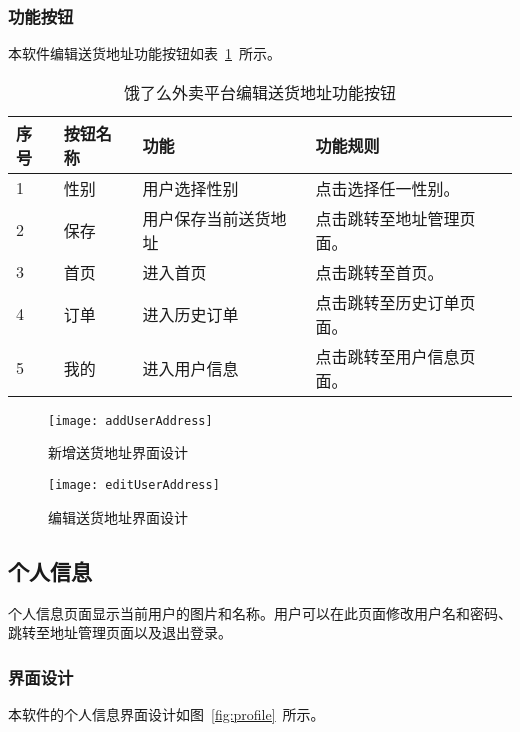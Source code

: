 \subsubsection{功能按钮}
本软件编辑送货地址功能按钮如表~\ref{tab:table12}~所示。
\begin{table}[htbp]
    \caption{饿了么外卖平台编辑送货地址功能按钮}\label{tab:table12}
    \vspace{0.5em}\wuhao
    \begin{tabularx}{\textwidth}{lllX}
    \toprule[1.5pt]
    序号 & 按钮名称 & 功能 & 功能规则 \\ 
    \midrule[1pt]
    1 & 性别 & 用户选择性别 & 点击选择任一性别。 \\
    2 & 保存 & 用户保存当前送货地址 & 点击跳转至地址管理页面。 \\
    3 & 首页 & 进入首页 & 点击跳转至首页。 \\
    4 & 订单 & 进入历史订单 & 点击跳转至历史订单页面。 \\
    5 & 我的 & 进入用户信息 & 点击跳转至用户信息页面。 \\
\bottomrule[1.5pt]
\end{tabularx}
\vspace{\baselineskip}
\end{table}
\begin{figure}[htbp]
    \centering
    \begin{minipage}{0.4\textwidth}
    \centering
    \texttt{[image: addUserAddress]}
    \caption{新增送货地址界面设计}\label{fig:addUserAddress}
    \end{minipage}
    \begin{minipage}{0.4\textwidth}
    \centering
    \texttt{[image: editUserAddress]}
    \caption{编辑送货地址界面设计}\label{fig:editUserAddress}
    \end{minipage}
    \vspace{\baselineskip}
\end{figure}

\subsection{个人信息}
个人信息页面显示当前用户的图片和名称。用户可以在此页面修改用户名和密码、跳转至地址管理页面以及退出登录。
\subsubsection{界面设计}
本软件的个人信息界面设计如图~\ref{fig:profile}~所示。
